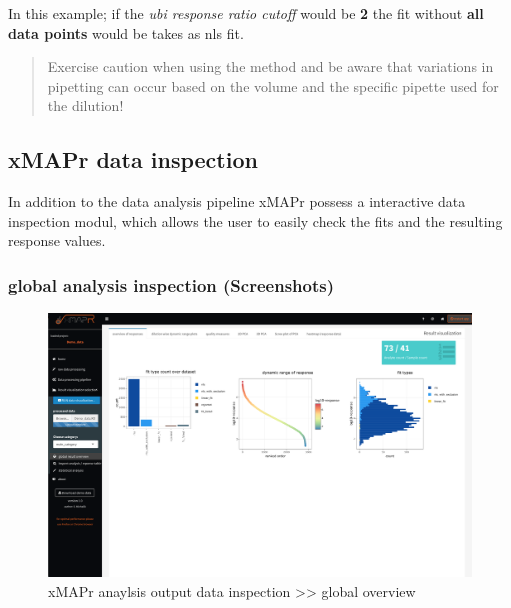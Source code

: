 \documentclass[
]{book}
\begin{document}
In this example; if the \emph{ubi response ratio cutoff} would be \textbf{2} the fit without \textbf{all data points} would be takes as nls fit.

\begin{quote}
Exercise caution when using the method and be aware that variations in pipetting can occur based on the volume and the specific pipette used for the dilution!
\end{quote}

\hypertarget{xmapr-data-inspection}{%
\subsection{xMAPr data inspection}\label{xmapr-data-inspection}}

In addition to the data analysis pipeline xMAPr possess a interactive data inspection modul, which allows the user to easily check the fits and the resulting response values.

\hypertarget{global-analysis-inspection-screenshots}{%
\subsubsection{global analysis inspection (Screenshots)}\label{global-analysis-inspection-screenshots}}

\begin{figure}

{\centering \includegraphics[width=50.5in]{figures/global_result_overview} 

}

\caption{xMAPr anaylsis output data inspection >> global overview}\label{fig:globalResultOverview}
\end{figure}
\end{document}
